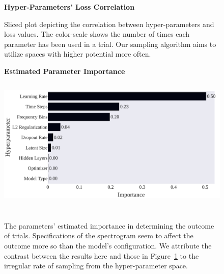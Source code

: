 \documentclass[\main/thesis.tex]{subfiles}
\begin{document}
\begin{figure}[]
\begin{center}
    \textbf{Hyper-Parameters' Loss Correlation}
      \caption{Sliced plot depicting the correlation between hyper-parameters and loss values. The color-scale shows the number of times each parameter has been used in a trial. Our sampling algorithm aims to utilize spaces with higher potential more often. }
    \label{fig:slicegraph}
    \end{center}

\end{figure}
   

\begin{figure}[]
\centering
\textbf{Estimated Parameter Importance}
\includegraphics[width=14cm,height=7cm]{images/chapter_3/ParameterImportances_final.pdf}
\caption{The parameters' estimated importance in determining the outcome of trials. Specifications of the spectrogram seem to affect the outcome more so than the model's configuration. We attribute the contrast between the results here and those in Figure~\ref{fig:slicegraph} to the irregular rate of sampling from the hyper-parameter space.}
\label{chap3:param_importance}
\end{figure}
\end{document}

